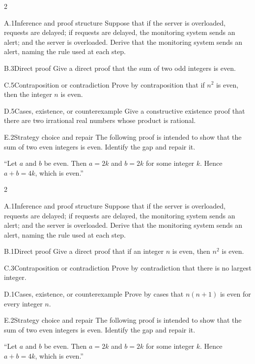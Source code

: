 \documentclass[9pt]{extarticle}
\begin{document}
\begin{multicols}{2}
\begin{CoreProblem}{A.1}{Inference and proof structure}
Suppose that if the server is overloaded, requests are delayed; if requests are
delayed, the monitoring system sends an alert; and the server is overloaded.
Derive that the monitoring system sends an alert, naming the rule used at each
step.
\end{CoreProblem}
\begin{CoreProblem}{B.3}{Direct proof}
Give a direct proof that the sum of two odd integers is even.
\end{CoreProblem}
\begin{CoreProblem}{C.5}{Contraposition or contradiction}
Prove by contraposition that if $n^2$ is even, then the integer $n$ is even.
\end{CoreProblem}
\columnbreak
\begin{CoreProblem}{D.5}{Cases, existence, or counterexample}
Give a constructive existence proof that there are two irrational real numbers
whose product is rational.
\end{CoreProblem}
\begin{CoreProblem}{E.2}{Strategy choice and repair}
The following proof is intended to show that the sum of two even integers is even. Identify the gap and repair it.

``Let $a$ and $b$ be even. Then $a=2k$ and $b=2k$ for some integer $k$. Hence $a+b=4k$, which is even.''
\end{CoreProblem}
\end{multicols}
\CoreWorkArea
\FormBreak
{}
\begin{multicols}{2}
\begin{CoreProblem}{A.1}{Inference and proof structure}
Suppose that if the server is overloaded, requests are delayed; if requests are
delayed, the monitoring system sends an alert; and the server is overloaded.
Derive that the monitoring system sends an alert, naming the rule used at each
step.
\end{CoreProblem}
\begin{CoreProblem}{B.1}{Direct proof}
Give a direct proof that if an integer $n$ is even, then $n^2$ is even.
\end{CoreProblem}
\begin{CoreProblem}{C.3}{Contraposition or contradiction}
Prove by contradiction that there is no largest integer.
\end{CoreProblem}
\columnbreak
\begin{CoreProblem}{D.1}{Cases, existence, or counterexample}
Prove by cases that $n(n+1)$ is even for every integer $n$.
\end{CoreProblem}
\begin{CoreProblem}{E.2}{Strategy choice and repair}
The following proof is intended to show that the sum of two even integers is even. Identify the gap and repair it.

``Let $a$ and $b$ be even. Then $a=2k$ and $b=2k$ for some integer $k$. Hence $a+b=4k$, which is even.''
\end{CoreProblem}
\end{multicols}
\end{document}
